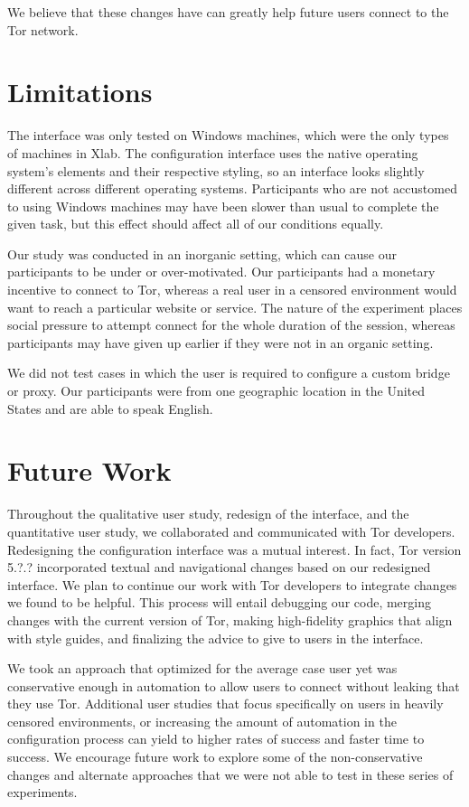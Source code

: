 \documentclass[USenglish,oneside,twocolumn]{article}
\begin{document}
We believe that these changes have can greatly help future users connect to the Tor network. 

\section{Limitations} 
The interface was only tested on Windows machines, which were the only types of machines in Xlab. The configuration interface uses the native operating system's elements and their respective styling, so an interface looks slightly different across different operating systems. Participants who are not accustomed to using Windows machines may have been slower than usual to complete the given task, but this effect should affect all of our conditions equally. 

Our study was conducted in an inorganic setting, which can cause our participants to be under or over-motivated. Our participants had a monetary incentive to connect to Tor, whereas a real user in a censored environment would want to reach a particular website or service. The nature of the experiment places social pressure to attempt connect for the whole duration of the session, whereas participants may have given up earlier if they were not in an organic setting.   

We did not test cases in which the user is required to configure a custom bridge or proxy. Our participants were from one geographic location in the United States and are able to speak English.

\section{Future Work} 
Throughout the qualitative user study, redesign of the interface, and the quantitative user study, we collaborated and communicated with Tor developers. Redesigning the configuration interface was a mutual interest. In fact, Tor version {\color{red} 5.?.?} incorporated textual and navigational changes based on our redesigned interface. We plan to continue our work with Tor developers to integrate changes we found to be helpful. This process will entail debugging our code, merging changes with the current version of Tor, making high-fidelity graphics that align with style guides, and finalizing the advice to give to users in the interface. 

We took an approach that optimized for the average case user yet was conservative enough in automation to allow users to connect without leaking that they use Tor. Additional user studies that focus specifically on users in heavily censored environments, or increasing the amount of automation in the configuration process can yield to higher rates of success and faster time to success. We encourage future work to explore some of the non-conservative changes and alternate approaches that we were not able to test in these series of experiments.\\
\end{document}
